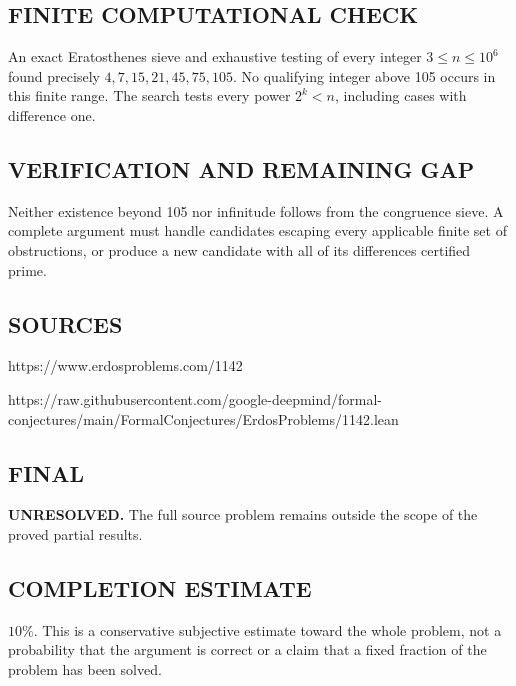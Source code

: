 \subsection*{FINITE COMPUTATIONAL CHECK}
An exact Eratosthenes sieve and exhaustive testing of every integer $3\le n\le10^6$ found precisely $4,7,15,21,45,75,105$. No qualifying integer above 105 occurs in this finite range. The search tests every power $2^k<n$, including cases with difference one.

\subsection*{VERIFICATION AND REMAINING GAP}
Neither existence beyond 105 nor infinitude follows from the congruence sieve.
A complete argument must handle candidates escaping every applicable finite set
of obstructions, or produce a new candidate with all of its differences certified prime.

\subsection*{SOURCES}
https://www.erdosproblems.com/1142

https://raw.githubusercontent.com/google-deepmind/formal-conjectures/main/FormalConjectures/ErdosProblems/1142.lean

\subsection*{FINAL}
\textbf{UNRESOLVED.} The full source problem remains outside the scope of the proved partial results.

\subsection*{COMPLETION ESTIMATE}
$10\%$. This is a conservative subjective estimate toward the whole problem, not a probability that the argument is correct or a claim that a fixed fraction of the problem has been solved.
